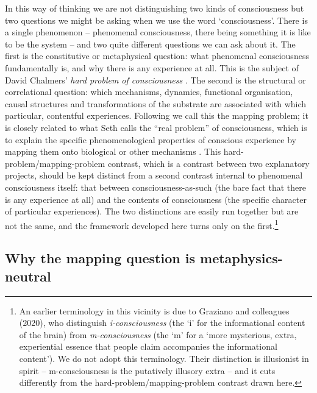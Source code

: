 \documentclass[11pt, a4paper, onecolumn, gdm]{google}
\begin{document}
In this way of thinking we are not distinguishing two kinds of consciousness but two questions we might be asking when we use the word `consciousness'.
There is a single phenomenon -- phenomenal consciousness, there being something it is like to be the system -- and two quite different questions we can ask about it.
The first is the constitutive or metaphysical question: what phenomenal consciousness fundamentally is, and why there is any experience at all.
This is the subject of David Chalmers' \emph{hard problem of consciousness} \citep{chalmers1995}.
The second is the structural or correlational question: which mechanisms, dynamics, functional organisation, causal structures and transformations of the substrate are associated with which particular, contentful experiences.
Following \citet{bourget2019} we call this the mapping problem; it is closely related to what Seth calls the ``real problem'' of consciousness, which is to explain the specific phenomenological properties of conscious experience by mapping them onto biological or other mechanisms \citep{seth2016,seth2021}.
This hard-problem/mapping-problem contrast, which is a contrast between two explanatory projects, should be kept distinct from a second contrast internal to phenomenal consciousness itself: that between consciousness-as-such (the bare fact that there is any experience at all) and the contents of consciousness (the specific character of particular experiences).
The two distinctions are easily run together but are not the same, and the framework developed here turns only on the first.\footnote{An earlier terminology in this vicinity is due to Graziano and colleagues (2020), who distinguish \emph{i-consciousness} (the `i' for the informational content of the brain) from \emph{m-consciousness} (the `m' for a `more mysterious, extra, experiential essence that people claim accompanies the informational content'). We do not adopt this terminology. Their distinction is illusionist in spirit -- m-consciousness is the putatively illusory extra -- and it cuts differently from the hard-problem/mapping-problem contrast drawn here.}

\subsection{Why the mapping question is metaphysics-neutral}\label{why-the-mapping-question-is-metaphysics-neutral}
\end{document}
